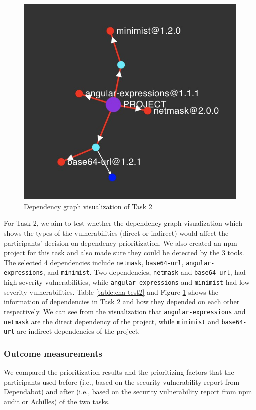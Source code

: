 \documentclass[conference]{IEEEtran}
\begin{document}
	\begin{figure}[tb]
		\centering
		\includegraphics[width=0.7\columnwidth]{Figures/Achilles-Test2.jpeg}
		\caption{Dependency graph visualization of Task 2}
		\label{fig:graphtest2}
	\end{figure}
	
	For Task 2, we aim to test whether the dependency graph visualization which shows the types of the vulnerabilities (direct or indirect) would affect the participants’ decision on dependency prioritization. We also created an npm project for this task and also made sure they could be detected by the 3 tools. The selected 4 dependencies include \texttt{netmask}, \texttt{base64-url}, \texttt{angular-expressions}, and \texttt{minimist}. Two dependencies, \texttt{netmask} and \texttt{base64-url}, had high severity vulnerabilities, while \texttt{angular-expressions} and \texttt{minimist} had low severity vulnerabilities. Table \ref{table:cha-test2} and Figure \ref{fig:graphtest2} shows the information of dependencies in Task 2 and how they depended on each other respectively. We can see from the visualization that \texttt{angular-expressions} and \texttt{netmask} are the direct dependency of the project, while \texttt{minimist} and \texttt{base64-url} are indirect dependencies of the project.
	
	\subsubsection{Outcome measurements} We compared the prioritization results and the prioritizing factors that the participants used before (i.e., based on the security vulnerability report from Dependabot) and after (i.e., based on the security vulnerability report from npm audit or Achilles) of the two tasks.  %
	
\end{document}

